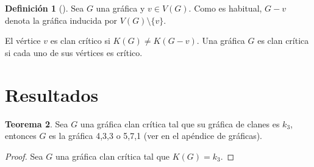 \documentclass[12pt]{book}
\theoremstyle{definition}
\newtheorem{theorem}{Teorema}[chapter]
\newtheorem{definition}[theorem]{Definición}
\begin{document}
\begin{definition}[\citealt{Alcon:2006}]
Sea $G$ una gráfica y $v \in V(G)$. Como es habitual, $G-v$ denota la gráfica inducida por $V(G)\setminus \{v\}$.  

El vértice $v$ es clan crítico si $K(G)\neq K(G-v)$. Una gráfica $G$ es clan crítica si cada uno de sus vértices es crítico.
\end{definition}



\section*{Resultados}

\begin{theorem}
	Sea $G$ una gráfica clan crítica tal que su gráfica de clanes es $k_3$, entonces $G$ es la gráfica 4,3,3 o 5,7,1 (ver en \cite{Harary:1969} el apéndice de gráficas).
\end{theorem}
\begin{proof}
Sea $G$ una gráfica clan crítica tal que $K(G)=k_3$.
\end{proof}













\end{document}
